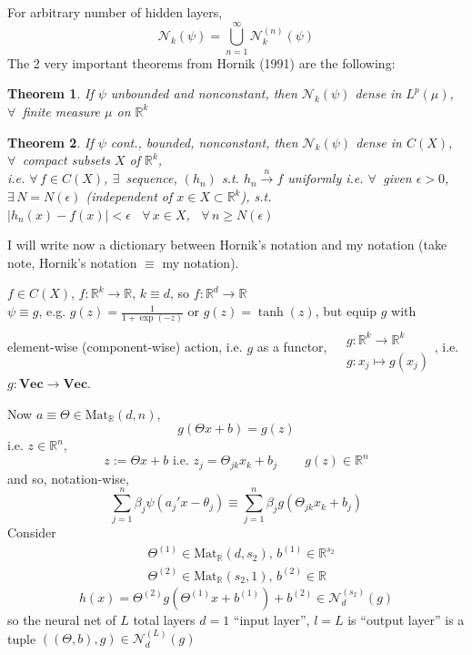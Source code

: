 \documentclass[10pt]{amsart}
\newtheorem{theorem}{Theorem}
\begin{document}
\begin{multicols*}{2}
For arbitrary number of hidden layers,
\[
\mathcal{N}_k(\psi) = \bigcup_{n=1}^{\infty}\mathcal{N}_k^{(n)}(\psi)
\]
The 2 very important theorems from Hornik (1991) are the following:
\begin{theorem}
If $\psi$ unbounded and nonconstant, then $\mathcal{N}_k(\psi)$ dense in $L^p(\mu)$, $\forall \, $ finite measure $\mu$ on $\mathbb{R}^k$
\end{theorem}
\begin{theorem}
  If $\psi$ cont., bounded, nonconstant, then $\mathcal{N}_k(\psi)$ dense in $C(X)$, \, $\forall \,$ compact subsets $X$ of $\mathbb{R}^k$, \\
  i.e. $\forall \, f\in C(X)$, $\exists \, $ sequence, $(h_n)$ s.t. $h_n \xrightarrow{n} f$ uniformly i.e. $\forall \, $ given $\epsilon >0$, $\exists \, N=N(\epsilon)$ (independent of $x\in X\subset \mathbb{R}^k$), s.t. \\
  $|h_n(x)-f(x)| < \epsilon$ \, $\forall \, x \in X$, \, $\forall \, n \geq N(\epsilon)$
  \end{theorem}
I will write now a dictionary between Hornik's notation and my notation (take note, Hornik's notation $\equiv$ my notation).  

$f\in C(X)$, $f:\mathbb{R}^k\to \mathbb{R}$, $k\equiv d$, so $f:\mathbb{R}^d \to \mathbb{R}$ \\
 
$\psi \equiv g$, e.g. $g(z) = \frac{1}{1 + \exp{(-z)} }$ or $g(z) = \tanh{(z)}$, but equip $g$ with element-wise (component-wise) action, i.e. $g$ as a functor, $\begin{aligned} & \quad \\ 
    & g:\mathbb{R}^k \to \mathbb{R}^k \\
    & g:x_j\mapsto g(x_j) \end{aligned}$, i.e. $g: \mathbf{Vec} \to \mathbf{Vec}$.


  Now $a \equiv \Theta \in \text{Mat}_{\mathbb{R}}(d,n)$,
  \[
g(\Theta x + b) = g(z)
\]
i.e. $z\in \mathbb{R}^n$,
\[
z:= \Theta x + b \text{ i.e. } z_j = \Theta_{jk} x_k + b_j \qquad \, g(z) \in \mathbb{R}^n
\]
and so, notation-wise,
\[
\sum_{j=1}^n \beta_j \psi(a_j'x  - \theta_j) \equiv \sum_{j=1}^n \beta_j g(\Theta_{jk} x_k +b_j)
\]
Consider
\[
\begin{aligned}
  & \Theta^{(1)} \in \text{Mat}_{\mathbb{R}}(d,s_2), \, b^{(1)} \in \mathbb{R}^{s_2} \\ 
  & \Theta^{(2)} \in \text{Mat}_{\mathbb{R}}(s_2,1) , \, b^{(2)} \in \mathbb{R}
\end{aligned}
\]
\[
h(x) = \Theta^{(2)}g( \Theta^{(1)}x + b^{(1)}) + b^{(2)} \in \mathcal{N}_d^{(s_2)}(g)
\]
so the neural net of $L$ total layers $d=1$ ``input layer'', $l=L$ is ``output layer'' is a tuple $((\Theta,b),g)\in \mathcal{N}_d^{(L)}(g)$


\end{multicols*}
\end{document}
